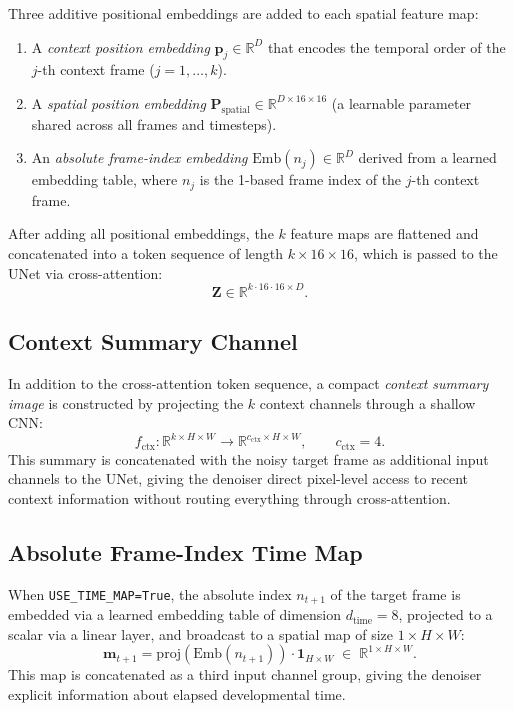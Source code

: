 \documentclass[12pt, a4paper, twoside]{report}
\newcommand{\ctx}{\text{ctx}}
\newcommand{\R}{\mathbb{R}}
\begin{document}
Three additive positional embeddings are added to each spatial feature map:
\begin{enumerate}
  \item A \emph{context position embedding} $\mathbf{p}_j \in \R^D$ that
        encodes the temporal order of the $j$-th context frame ($j=1,\ldots,k$).
  \item A \emph{spatial position embedding}
        $\mathbf{P}_{\text{spatial}} \in \R^{D \times 16 \times 16}$
        (a learnable parameter shared across all frames and timesteps).
  \item An \emph{absolute frame-index embedding}
        $\text{Emb}(n_j) \in \R^D$ derived from a learned embedding table,
        where $n_j$ is the 1-based frame index of the $j$-th context frame.
\end{enumerate}

After adding all positional embeddings, the $k$ feature maps are flattened and
concatenated into a token sequence of length $k \times 16 \times 16$,
which is passed to the UNet via cross-attention:
\[
  \mathbf{Z} \in \R^{k \cdot 16 \cdot 16 \times D}.
\]

\subsection{Context Summary Channel}
\label{ssec:ctx_summary}

In addition to the cross-attention token sequence, a compact \emph{context
summary image} is constructed by projecting the $k$ context channels through
a shallow CNN:
\[
  f_\ctx: \R^{k \times H \times W} \to \R^{c_\ctx \times H \times W},
  \qquad c_\ctx = 4.
\]
This summary is concatenated with the noisy target frame as additional input
channels to the UNet, giving the denoiser direct pixel-level access to
recent context information without routing everything through cross-attention.

\subsection{Absolute Frame-Index Time Map}
\label{ssec:time_map}

When \texttt{USE\_TIME\_MAP=True}, the absolute index $n_{t+1}$ of the target
frame is embedded via a learned embedding table of dimension
$d_\text{time} = 8$, projected to a scalar via a linear layer, and broadcast
to a spatial map of size $1 \times H \times W$:
\[
  \mathbf{m}_{t+1} = \text{proj}(\text{Emb}(n_{t+1})) \cdot \mathbf{1}_{H \times W}
  \;\in\; \R^{1 \times H \times W}.
\]
This map is concatenated as a third input channel group, giving the denoiser
explicit information about elapsed developmental time.
\end{document}
